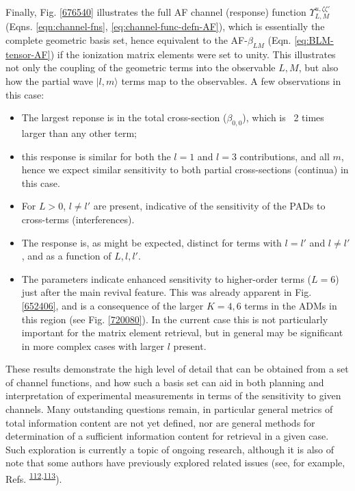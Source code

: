 \documentclass[10pt]{article}
\begin{document}
Finally, Fig. \ref{676540} illustrates the full AF channel (response) function $\varUpsilon_{L,M}^{u,\zeta\zeta'}$ (Eqns. \ref{eqn:channel-fns}, \ref{eq:channel-func-defn-AF}), which is essentially the complete geometric basis set,
hence equivalent to the AF-$\beta_{LM}$ (Eqn. \ref{eq:BLM-tensor-AF}) if the ionization matrix elements were set to unity. This illustrates not only the coupling of the geometric terms into the observable $L,M$, but also how the partial wave $|l,m\rangle$ terms map to the observables. %
A few observations in this case:

\begin{itemize}
\item The largest reponse is in the total cross-section ($\beta_{0,0}$), which is ~2 times larger than any other term; 
\item this response is similar for both the $l=1$ and $l=3$ contributions, and all $m$, hence we expect similar sensitivity to both partial cross-sections (continua) in this case.
\item For $L>0$, $l\neq l'$ are present, indicative of the sensitivity of the PADs to cross-terms (interferences).
\item The response is, as might be expected, distinct for terms with $l=l'$ and $l\neq l'$, and as a function of $L,l,l'$.
\item The parameters indicate enhanced sensitivity to higher-order terms ($L=6$) just after the main revival feature. This was already apparent in Fig. \ref{652406}, and is a consequence of the larger $K=4,6$ terms in the ADMs in this region (see Fig. \ref{720080}). In the current case this is not particularly important for the matrix element retrieval, but in general may be significant in more complex cases with larger $l$ present.

\end{itemize}

These results demonstrate the high level of detail that can be obtained from a set of channel functions, and how such a basis set can aid in both planning and interpretation of experimental measurements in terms of the sensitivity to given channels. Many outstanding questions remain, in particular general metrics of total information content are not yet defined, nor are general methods for determination of a sufficient information content for retrieval in a given case. Such exploration is currently a topic of ongoing research, although it is also of note that some authors have previously explored related issues (see, for example, Refs. \textsuperscript{\hyperref[csl:112]{112},\hyperref[csl:113]{113}}).
\end{document}

